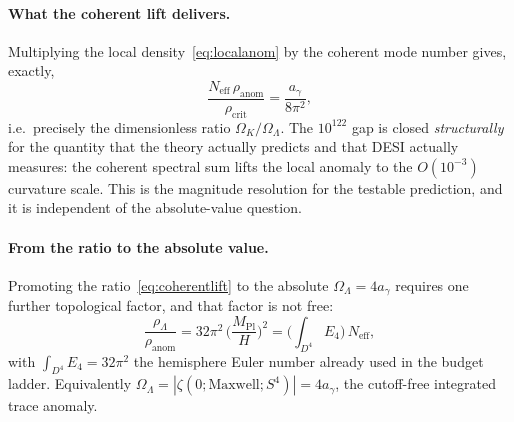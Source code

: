 \documentclass[11pt,a4paper]{article}
\theoremstyle{plain}
\theoremstyle{definition}
\theoremstyle{remark}
\newcommand{\Ok}{\Omega_K}
\newcommand{\OL}{\Omega_\Lambda}
\newcommand{\ag}{a_\gamma}
\newcommand{\Mpl}{M_{\mathrm{Pl}}}
\begin{document}
\paragraph{What the coherent lift delivers.} Multiplying the local density~\eqref{eq:localanom}
by the coherent mode number gives, exactly,
\begin{equation}
\frac{N_{\mathrm{eff}}\,\rho_{\mathrm{anom}}}{\rho_{\mathrm{crit}}} = \frac{\ag}{8\pi^2},
\label{eq:coherentlift}
\end{equation}
i.e.\ precisely the dimensionless ratio $\Ok/\OL$. The $10^{122}$ gap is closed
\emph{structurally} for the quantity that the theory actually predicts and that DESI actually
measures: the coherent spectral sum lifts the local anomaly to the $O(10^{-3})$ curvature scale.
This is the magnitude resolution for the testable prediction, and it is independent of the
absolute-value question.

\paragraph{From the ratio to the absolute value.} Promoting the ratio~\eqref{eq:coherentlift} to
the absolute $\OL = 4\ag$ requires one further topological factor, and that factor is not free:
\begin{equation}
\frac{\rho_\Lambda}{\rho_{\mathrm{anom}}} = 32\pi^2\,\Big(\frac{\Mpl}{H}\Big)^2
= \Big(\int_{D^4} E_4\Big)\,N_{\mathrm{eff}},
\end{equation}
with $\int_{D^4}E_4 = 32\pi^2$ the hemisphere Euler number already used in the budget ladder.
Equivalently $\OL = |\zeta(0;\text{Maxwell};S^4)| = 4\ag$, the cutoff-free integrated trace
anomaly.
\end{document}
